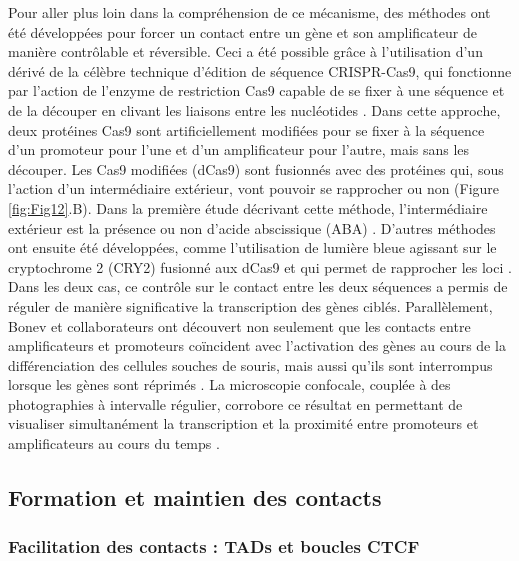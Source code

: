 Pour aller plus loin dans la compréhension de ce mécanisme, des méthodes ont été développées pour forcer un contact entre un gène et son \gls{amplificateur} de manière contrôlable et réversible. Ceci a été possible grâce à l’utilisation d’un dérivé de la célèbre technique d’édition de séquence CRISPR-Cas9, qui fonctionne par l’action de l’enzyme de restriction Cas9 capable de se fixer à une séquence et de la découper en clivant les liaisons entre les nucléotides \citep{doudna_new_2014}. Dans cette approche, deux protéines Cas9 sont artificiellement modifiées pour se fixer à la séquence d’un promoteur pour l’une et d’un \gls{amplificateur} pour l’autre, mais sans les découper. Les Cas9 modifiées (dCas9) sont fusionnés avec des protéines qui, sous l’action d’un intermédiaire extérieur, vont pouvoir se rapprocher ou non (Figure \ref{fig:Fig12}.B). Dans la première étude décrivant cette méthode, l’intermédiaire extérieur est la présence ou non d’acide abscissique (ABA) \citep{morgan_manipulation_2017}. D’autres méthodes ont ensuite été développées, comme l’utilisation de lumière bleue agissant sur le cryptochrome 2 (CRY2) fusionné aux dCas9 et qui permet de rapprocher les loci \citep{kim_ladl_2019}. Dans les deux cas, ce contrôle sur le contact entre les deux séquences a permis de réguler de manière significative la transcription des gènes ciblés. Parallèlement, Bonev et collaborateurs ont découvert non seulement que les contacts entre \glspl{amplificateur} et promoteurs coïncident avec l'activation des gènes au cours de la différenciation des cellules souches de souris, mais aussi qu'ils sont interrompus lorsque les gènes sont réprimés \citep{bonev_multiscale_2017}. La microscopie confocale, couplée à des photographies à intervalle régulier, corrobore ce résultat en permettant de visualiser simultanément la transcription et la proximité entre promoteurs et \glspl{amplificateur} au cours du temps \citep{chen_dynamic_2018}.

\subsection{Formation et maintien des contacts}
\label{subsec:formation-contact}
\subsubsection{Facilitation des contacts : TADs et boucles CTCF}
\label{subsubsec:TAD-boucle}

